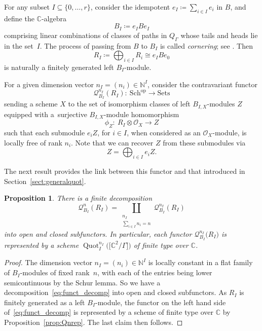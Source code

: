 \documentclass[10pt,a4paper]{amsart}
\newtheorem{Proposition}[Theorem]{Proposition}
 { \theoremstyle{definition}
\newtheorem{Definition}[Theorem]{Definition}
\newtheorem{Example}[Theorem]{Example}
\newtheorem{Remark}[Theorem]{Remark}
\newtheorem{remarks}[theorem]{Remarks}
}
\newcommand{\SC}{\mathbb{C}} %
\newcommand{\PiGamma}{B}
\DeclareMathOperator{\Quot}{\mathrm{Quot}}
\newcommand{\QuotI}[1][ ]{\Quot_I^{#1}}
\newcommand{\QuotInI}{\QuotI[n_I]}
\numberwithin{equation}{section}
\begin{document}
For any subset $I \subseteq \{0,\dots,r\}$,
consider the idempotent
$e_I\coloneqq\sum_{i \in I} e_i$ in $B$,
and define the $\SC$-algebra
\begin{equation} \label{eqn:BI}
\PiGamma_I\coloneqq e_I \PiGamma e_I \end{equation}
comprising linear combinations of
classes of paths in $Q_\Gamma$ whose tails and heads lie in the set~$I$. The process of passing
from $\PiGamma$ to $\PiGamma_I$ is called \emph{cornering}; see \cite[Remark 3.1]{craw2018multigraded}.
Then \[ R_I\coloneqq\bigoplus_{i \in I} R_i \cong e_I \PiGamma e_0\] is naturally a finitely generated left $\PiGamma_I$-module.

For a given dimension vector $n_I=(n_i) \in \mathbb{N}^{I}$,
consider the contravariant functor
\[
\mathcal{Q}^{n_I}_{\PiGamma_I}(R_I)\colon \ \mathrm{Sch}^{\mathrm{op}} \to \mathrm{Sets} \]
sending a scheme $X$ to the set of isomorphism classes of left $\PiGamma_{I,X}$-modules $Z$ equipped with a~surjective $\PiGamma_{I,X}$-module homomorphism
\[
\phi_Z\colon \ R_I
\otimes \mathcal{O}_X \to Z
\]
such that each submodule $e_iZ$, {for $i\in I$,}
when considered as an $\mathcal O_{X}$-module, is locally free of rank $n_i$. Note that we can recover $Z$ from these submodules via
\begin{equation*}
Z=\bigoplus_{i\in I} e_i Z.
\end{equation*}

The next result provides the link between this functor and that introduced in Section~\ref{sect:generalquot}.
\begin{Proposition} There is a finite decomposition
\begin{equation}\mathcal{Q}^{n}_{\PiGamma_I}(R_I)=\coprod_{\substack{n_I\\ \sum_{i \in I} n_i =n}} \mathcal{Q}^{n_I}_{\PiGamma_I}(R_I)
\label{eq:funct_decomp}\end{equation}
into open and closed subfunctors.
In particular, each functor
$\mathcal{Q}^{n_I}_{\PiGamma_I}\big(R_I\big)$ is represented by a scheme $\QuotInI\big(\big[\SC^2/\Gamma\big]\big)$ of finite type over $\SC$.
\end{Proposition}
\begin{proof} The dimension vector $n_I=(n_i) \in \mathbb{N}^{I}$ is locally constant in a flat family of $\PiGamma_I$-modules of fixed rank~$n$, with each of the entries being lower semicontinuous by the Schur lemma.
So we have a decomposition~\eqref{eq:funct_decomp} into open and closed subfunctors.
As $R_I$ is finitely generated as a left $B_I$-module, the functor on the left hand side of~\eqref{eq:funct_decomp} is represented by a scheme of finite type over $\SC$ by Proposition~\ref{prop:Qnrep}. The last claim then follows.
\end{proof}
\end{document}
